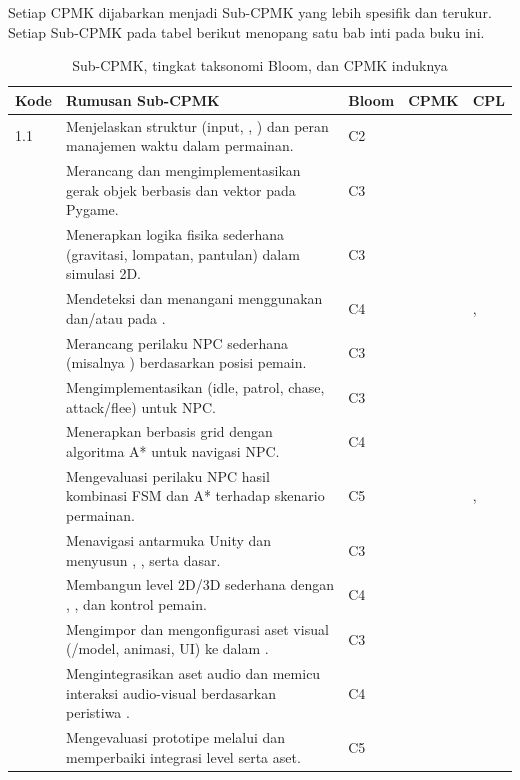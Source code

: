 Setiap CPMK dijabarkan menjadi Sub-CPMK yang lebih spesifik dan terukur.
Setiap Sub-CPMK pada tabel berikut menopang satu bab inti pada buku ini.

\begin{table}[htbp]
\centering
{\setlength{\tabcolsep}{4pt}\footnotesize%
\caption{Sub-CPMK, tingkat taksonomi Bloom, dan CPMK induknya}
\label{tab:subcpmk-buku}
\begin{tabularx}{\textwidth}{@{}C{1.5cm} Y C{1.6cm} C{1.5cm} C{1.7cm}@{}}
\toprule
\headrow \textbf{Kode} & \textbf{Rumusan Sub-CPMK} & \textbf{Bloom} & \textbf{CPMK} & \textbf{CPL} \\
 & Menjelaskan struktur  (input, ,
) dan peran manajemen waktu dalam permainan. &
C2 &  &  \\
 & Merancang dan mengimplementasikan gerak objek berbasis  dan vektor pada Pygame. & C3 &  &  \\
 & Menerapkan logika fisika sederhana (gravitasi, lompatan, pantulan)
dalam simulasi 2D. & C3 &  &  \\
 & Mendeteksi dan menangani  menggunakan 
dan/atau  pada . &
C4 &  & ,  \\
 & Merancang perilaku NPC sederhana (misalnya )
berdasarkan posisi pemain. & C3 &  &  \\
 & Mengimplementasikan  (idle, patrol,
chase, attack/flee) untuk NPC. & C3 &  &  \\
 & Menerapkan  berbasis grid dengan algoritma A*
untuk navigasi NPC. & C4 &  &  \\
 & Mengevaluasi perilaku NPC hasil kombinasi FSM dan A* terhadap
skenario permainan. & C5 &  & ,  \\
 & Menavigasi antarmuka Unity dan menyusun ,
, serta  dasar. &
C3 &  &  \\
 & Membangun level 2D/3D sederhana dengan ,
, dan kontrol pemain. & C4 &  &  \\
 & Mengimpor dan mengonfigurasi aset visual (/model,
animasi, UI) ke dalam . & C3 &  &  \\
 & Mengintegrasikan aset audio dan memicu interaksi audio-visual
berdasarkan peristiwa . & C4 &  &  \\
 & Mengevaluasi prototipe  melalui 
dan memperbaiki integrasi level serta aset. & C5 &  &  \\
\bottomrule
\end{tabularx}}
\end{table}

